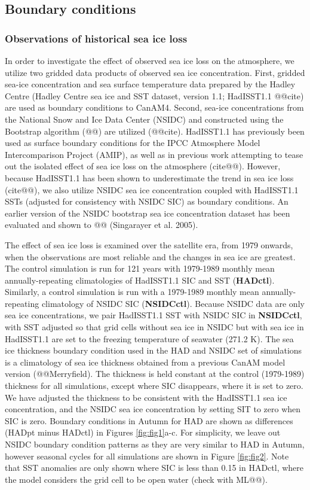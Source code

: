 \documentclass[twocol]{ametsoc}
\begin{document}
\subsection{Boundary conditions}
\subsubsection{Observations of historical sea ice loss}

In order to investigate the effect of observed sea ice loss on the atmosphere, we utilize two gridded data products of observed sea ice concentration. First, gridded sea-ice concentration and sea surface temperature data prepared by the Hadley Centre (Hadley Centre sea ice and SST dataset, version 1.1; HadISST1.1 @@cite) are used as boundary conditions to CanAM4. Second, sea-ice concentrations from the National Snow and Ice Data Center (NSIDC) and constructed using the Bootstrap algorithm (@@) are utilized (@@cite). HadISST1.1 has previously been used as surface boundary conditions for the IPCC Atmosphere Model Intercomparison Project (AMIP), as well as in previous work attempting to tease out the isolated effect of sea ice loss on the atmosphere (cite@@). However, because HadISST1.1 has been shown to underestimate the trend in sea ice loss (cite@@), we also utilize NSIDC sea ice concentration coupled with HadISST1.1 SSTs (adjusted for consistency with NSIDC SIC) as boundary conditions. An earlier version of the NSIDC bootstrap sea ice concentration dataset has been evaluated and shown to @@ (Singarayer et al. 2005). 

The effect of sea ice loss is examined over the satellite era, from 1979 onwards, when the observations are most reliable and the changes in sea ice are greatest. The control simulation is run for 121 years with 1979-1989 monthly mean annually-repeating climatologies of HadISST1.1 SIC and SST (\textbf{HADctl}). Similarly, a control simulation is run with a 1979-1989 monthly mean annually-repeating climatology of NSIDC SIC (\textbf{NSIDCctl}). Because NSIDC data are only sea ice concentrations, we pair HadISST1.1 SST with NSIDC SIC in \textbf{NSIDCctl}, with SST adjusted so that grid cells without sea ice in NSIDC but with sea ice in HadISST1.1 are set to the freezing temperature of seawater (271.2 K). The sea ice thickness boundary condition used in the HAD and NSIDC set of simulations is a climatology of sea ice thickness obtained from a previous CanAM model version (@@Merryfield). The thickness is held constant at the control (1979-1989) thickness for all simulations, except where SIC disappears, where it is set to zero. We have adjusted the thickness to be consistent with the HadISST1.1 sea ice concentration, and the NSIDC sea ice concentration by setting SIT to zero when SIC is zero. Boundary conditions in Autumn for HAD are shown as differences (HADpt minus HADctl) in Figures \ref{fig:fig1}a-c. For simplicity, we leave out NSIDC boundary condition patterns as they are very similar to HAD in Autumn, however seasonal cycles for all simulations are shown in Figure \ref{fig:fig2}. Note that SST anomalies are only shown where SIC is less than 0.15 in HADctl, where the model considers the grid cell to be open water (check with ML@@).
\end{document}
